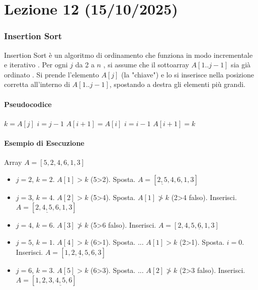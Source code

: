 
\part{Lezione 12 (15/10/2025) }

\section{Insertion Sort }
Insertion Sort è un algoritmo di ordinamento che funziona in modo incrementale e iterativo .
Per ogni $j$ da 2 a $n$ , si assume che il sottoarray $A[1..j-1]$ sia già ordinato .
Si prende l'elemento $A[j]$ (la "chiave") e lo si inserisce nella posizione corretta all'interno di $A[1..j-1]$, spostando a destra gli elementi più grandi.

\subsection{Pseudocodice}
\begin{algorithmic}[1]
        \State $k = A[j]$ 
        \State $i = j - 1$ 
         
            \State $A[i+1] = A[i]$ 
            \State $i = i - 1$
        \EndWhile
        \State $A[i+1] = k$ 
    \EndFor
\EndProcedure
\end{algorithmic}

\subsection{Esempio di Esecuzione }
\begin{example}
Array $A = [5, 2, 4, 6, 1, 3]$ 
\begin{itemize}
    \item $j=2$, $k=2$. $A[1]>k$ (5>2). Sposta. $A = [\underline{2, 5}, 4, 6, 1, 3]$ 
    \item $j=3$, $k=4$. $A[2]>k$ (5>4). Sposta. $A[1] \ngtr k$ (2>4 falso). Inserisci. $A = [2, \underline{4, 5}, 6, 1, 3]$ 
    \item $j=4$, $k=6$. $A[3] \ngtr k$ (5>6 falso). Inserisci. $A = [2, 4, 5, \underline{6}, 1, 3]$ 
    \item $j=5$, $k=1$. $A[4]>k$ (6>1). Sposta. ... $A[1]>k$ (2>1). Sposta. $i=0$. Inserisci. $A = [\underline{1, 2, 4, 5, 6}, 3]$ 
    \item $j=6$, $k=3$. $A[5]>k$ (6>3). Sposta. ... $A[2] \ngtr k$ (2>3 falso). Inserisci. $A = [1, 2, \underline{3, 4, 5, 6}]$ 
\end{itemize}
\end{example}

